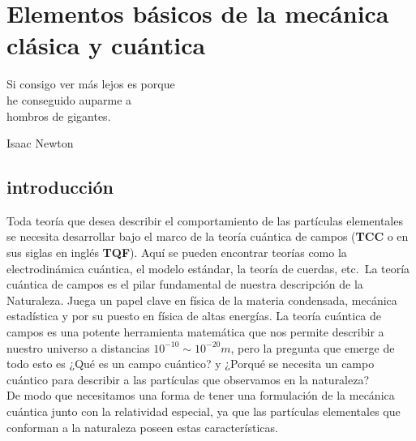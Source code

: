 %
%

\chapter{Elementos básicos de la mecánica clásica y cuántica}

\begin{FraseCelebre}
\begin{Frase}
    Si consigo ver más lejos es porque\\
    he conseguido auparme a\\
    hombros de gigantes.
\end{Frase}
\begin{Fuente}
    Isaac Newton
\end{Fuente}
\end{FraseCelebre}



\section{introducción}
\label{cap1:sec:Introduccion}

Toda teoría que desea describir el comportamiento de las partículas elementales se necesita desarrollar bajo  el marco de la teoría cuántica de campos (\textbf{TCC} o en sus siglas en inglés \textbf{TQF}). Aquí se pueden encontrar teorías como la electrodinámica cuántica, el modelo estándar, la teoría de cuerdas, etc.\
La teoría cuántica de campos es el pilar fundamental de nuestra descripción de la Naturaleza. Juega un papel clave en física de la materia condensada,  mecánica estadística y por su puesto en física de altas energías. La teoría cuántica de campos es una potente herramienta matemática que nos permite describir a nuestro universo a distancias $ 10^{-10} \sim 10^{-20} m$, pero la pregunta que emerge de todo esto es ¿Qué es un campo cuántico? y ¿Porqué se necesita un campo cuántico para describir a las partículas que observamos en la naturaleza?\\
De modo que necesitamos una forma de tener una formulación de la mecánica cuántica junto con la relatividad especial, ya que las partículas elementales que conforman a la naturaleza poseen estas características.

